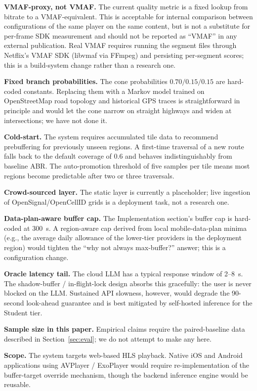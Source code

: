 \documentclass[conference]{IEEEtran}
\begin{document}
\textbf{VMAF-proxy, not VMAF.} The current quality metric is a fixed
lookup from bitrate to a VMAF-equivalent. This is acceptable for
internal comparison between configurations of the same player on the
same content, but is not a substitute for per-frame SDK measurement and
should not be reported as ``VMAF'' in any external publication. Real
VMAF requires running the segment files through Netflix's VMAF SDK
(libvmaf via FFmpeg) and persisting per-segment scores; this is a
build-system change rather than a research one.

\textbf{Fixed branch probabilities.} The cone probabilities $0.70 /
0.15 / 0.15$ are hard-coded constants. Replacing them with a Markov
model trained on OpenStreetMap road topology and historical GPS traces
is straightforward in principle and would let the cone narrow on
straight highways and widen at intersections; we have not done it.

\textbf{Cold-start.} The system requires accumulated tile data to
recommend prebuffering for previously unseen regions. A first-time
traversal of a new route falls back to the default coverage of $0.6$
and behaves indistinguishably from baseline ABR. The auto-promotion
threshold of five samples per tile means most regions become
predictable after two or three traversals.

\textbf{Crowd-sourced layer.} The static layer is currently a
placeholder; live ingestion of OpenSignal/OpenCellID grids is a
deployment task, not a research one.

\textbf{Data-plan-aware buffer cap.} The Implementation section's
buffer cap is hard-coded at 300~s. A region-aware cap derived from
local mobile-data-plan minima (e.g., the average daily allowance of
the lower-tier providers in the deployment region) would tighten the
``why not always max-buffer?'' answer; this is a configuration change.

\textbf{Oracle latency tail.} The cloud LLM has a typical response
window of 2--8~s. The shadow-buffer / in-flight-lock design absorbs
this gracefully: the user is never blocked on the LLM. Sustained API
slowness, however, would degrade the 90-second look-ahead guarantee
and is best mitigated by self-hosted inference for the Student tier.

\textbf{Sample size in this paper.} Empirical claims require the
paired-baseline data described in Section~\ref{sec:eval}; we do not
attempt to make any here.

\textbf{Scope.} The system targets web-based HLS playback. Native iOS
and Android applications using AVPlayer / ExoPlayer would require
re-implementation of the buffer-target override mechanism, though the
backend inference engine would be reusable.
\end{document}
